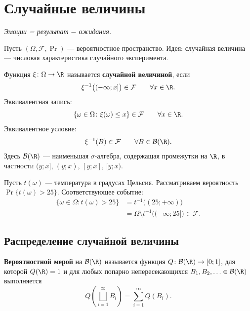 
\section{Случайные величины}

\begin{flushright}
    \textit{Эмоции = результат $-$ ожидания.}
\end{flushright}

Пусть $(\Omega,\mathcal{F},\Pr)$ --- вероятностное пространство.
Идея: случайная величина --- числовая характеристика
случайного эксперимента.

\begin{definition}
    Функция $\xi\colon\Omega\to\R$ называется
    \textbf{случайной величиной}, если
    \[
        \xi^{-1}\bigl((-\infty;x]\bigr)\in\mathcal{F}
        \qquad\forall x\in\R.
    \]
    Эквивалентная запись:
    \[
        \{\omega\in\Omega\colon\xi(\omega)\leq x\}
        \in\mathcal{F}
        \qquad\forall x\in\R.
    \]
    Эквивалентное условие:
    \[
        \xi^{-1}(B)\in\mathcal{F}
        \qquad\forall B\in\mathcal{B}(\R).
    \]
    Здесь $\mathcal{B}(\R)$ --- наименьшая $\sigma$-алгебра,
    содержащая промежутки на $\R$, в частности
    $(y;x]$, $(y;x)$, $[y;x]$, $[y;x)$.
\end{definition}

\begingroup
{}
\begin{example}[Температура]
    Пусть $t(\omega)$ --- температура в градусах Цельсия.
    Рассматриваем вероятность \mbox{$\Pr\{t(\omega)>25\}$}.
    Соответствующее событие:
    \[
        \begin{aligned}
            \{\omega\in\Omega\colon t(\omega)>25\}
            &=t^{-1}\bigl((25;+\infty)\bigr)\\
            &=\Omega\setminus t^{-1}\bigl((-\infty;25]\bigr)
            \in\mathcal{F}.
        \end{aligned}
    \]
\end{example}
\endgroup

\subsection{Распределение случайной величины}

\begin{definition}
    \textbf{Вероятностной мерой} на $\mathcal{B}(\R)$ называется
    функция $Q\colon\mathcal{B}(\R)\to[0;1]$, для которой
    $Q(\R)=1$ и для любых попарно непересекающихся
    $B_1,B_2,\ldots\in\mathcal{B}(\R)$ выполняется
    \[
        Q\left(\bigsqcup_{i=1}^{\infty}B_i\right)
        =\sum_{i=1}^{\infty}Q(B_i).
    \]
\end{definition}

